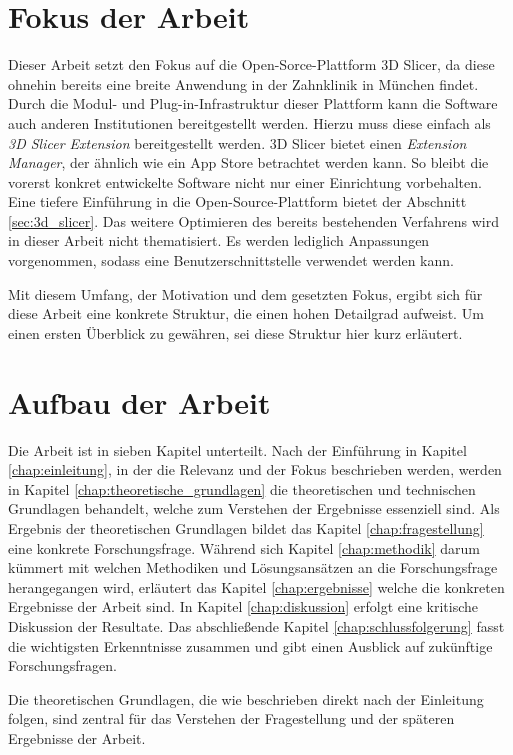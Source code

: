 \section{Fokus der Arbeit}
\label{sec:fokus_der-arbeit} Dieser Arbeit setzt den Fokus auf die Open-Sorce-Plattform
3D Slicer, da diese ohnehin bereits eine breite Anwendung in der Zahnklinik in München
findet. Durch die Modul- und Plug-in-Infrastruktur dieser Plattform kann die Software
auch anderen Institutionen bereitgestellt werden. Hierzu muss diese einfach als
\textit{3D Slicer Extension} bereitgestellt werden. 3D Slicer bietet einen
\textit{Extension Manager}, der ähnlich wie ein App Store betrachtet werden kann.
So bleibt die vorerst konkret entwickelte Software nicht nur einer Einrichtung vorbehalten.
Eine tiefere Einführung in die Open-Source-Plattform bietet der Abschnitt
\ref{sec:3d_slicer}. Das weitere Optimieren des bereits bestehenden Verfahrens wird
in dieser Arbeit nicht thematisiert. Es werden lediglich Anpassungen vorgenommen,
sodass eine Benutzerschnittstelle verwendet werden kann.

Mit diesem Umfang, der Motivation und dem gesetzten Fokus, ergibt sich für diese
Arbeit eine konkrete Struktur, die einen hohen Detailgrad aufweist. Um einen ersten
Überblick zu gewähren, sei diese Struktur hier kurz erläutert.

\section{Aufbau der Arbeit}
\label{sec:aufbau_der_arbeit} Die Arbeit ist in sieben Kapitel unterteilt. Nach der
Einführung in Kapitel \ref{chap:einleitung}, in der die Relevanz und der Fokus
beschrieben werden, werden in Kapitel \ref{chap:theoretische_grundlagen} die theoretischen
und technischen Grundlagen behandelt, welche zum Verstehen der Ergebnisse
essenziell sind. Als Ergebnis der theoretischen Grundlagen bildet das Kapitel \ref{chap:fragestellung}
eine konkrete Forschungsfrage. Während sich Kapitel \ref{chap:methodik} darum
kümmert mit welchen Methodiken und Lösungsansätzen an die Forschungsfrage
herangegangen wird, erläutert das Kapitel \ref{chap:ergebnisse} welche die konkreten
Ergebnisse der Arbeit sind. In Kapitel \ref{chap:diskussion} erfolgt eine
kritische Diskussion der Resultate. Das abschließende Kapitel \ref{chap:schlussfolgerung}
fasst die wichtigsten Erkenntnisse zusammen und gibt einen Ausblick auf zukünftige
Forschungsfragen.

Die theoretischen Grundlagen, die wie beschrieben direkt nach der Einleitung
folgen, sind zentral für das Verstehen der Fragestellung und der späteren Ergebnisse
der Arbeit.
